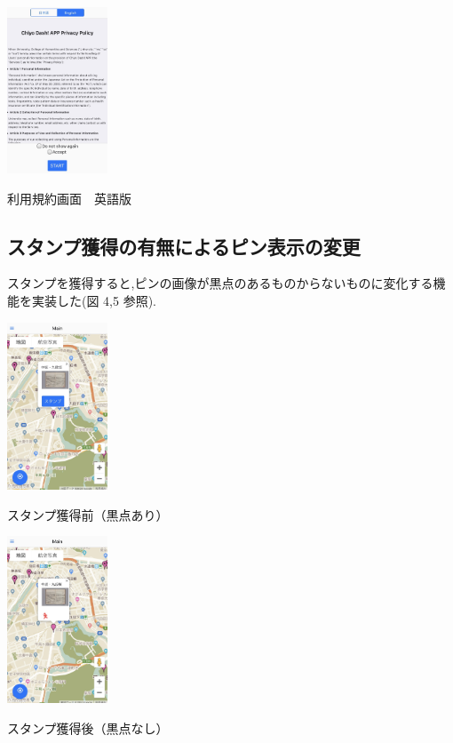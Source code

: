 \documentclass[a4paper, twoside]{jarticle}
\makeatletter
\newenvironment{figurehere}
  {\def\@captype{figure}}
  {}
\makeatother
\begin{document}
\begin{multicols}{2}
\begin{figurehere}
\begin{center}
\includegraphics[bb=30 50 550 1300,width=3cm]{./image03.jpg}%
\end{center}
\caption{利用規約画面　英語版}\label{fig:3}
\end{figurehere}


\subsection{スタンプ獲得の有無によるピン表示の変更}
スタンプを獲得すると,ピンの画像が黒点のあるものからないものに変化する機能を実装した(図 4,5 参照).
\begin{figurehere}
\begin{center}
\includegraphics[bb=30 50 550 1300,width=3cm]{./image05.jpg}%
\end{center}
\caption{スタンプ獲得前（黒点あり）}\label{fig:4}

\begin{center}
\includegraphics[bb=30 50 550 1300,width=3cm]{./image06.jpg}%
\end{center}
\caption{スタンプ獲得後（黒点なし）}\label{fig:5}
\end{figurehere}


\end{multicols}
\end{document}
